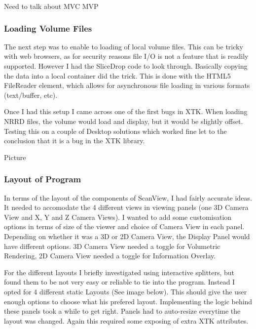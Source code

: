 \documentclass[a4paper,11pt,titlepage]{article}
\begin{document}
Need to talk about MVC MVP


\subsubsection{Loading Volume Files}

The next step was to enable to loading of local volume files. This can be tricky with web browsers, as for security reasons file I/O is not a feature that is readily supported. However I had the SliceDrop code to look through. Basically copying the data into a local container did the trick. This is done with the HTML5 FileReader element, which allows for asynchronous file loading in various formats (text/buffer, etc).

Once I had this setup I came across one of the first bugs in XTK. When loading NRRD files, the volume would load and display, but it would be slightly offset. Testing this on a couple of Desktop solutions which worked fine let to the conclusion that it is a bug in the XTK library. 

Picture



\subsubsection{Layout of Program}

In terms of the layout of the components of ScanView, I had fairly accurate ideas. It needed to accomodate the 4 different views in viewing panels (one 3D Camera View and X, Y and Z Camera Views). I wanted to add some customisation options in terms of size of the viewer and choice of Camera View in each panel. Depending on whether it was a 3D or 2D Camera View, the Display Panel would have different options. 3D Camera View needed a toggle for Volumetric Rendering, 2D Camera View needed a toggle for Information Overlay.







For the different layouts I briefly investigated using interactive splitters, but found them to be not very easy or reliable to tie into the program. Instead I opted for 4 different static Layouts (See image below). This should give the user enough options to choose what his prefered layout. Implementing the logic behind these panels took a while to get right. Panels had to auto-resize everytime the layout was changed. Again this required some exposing of extra XTK attributes.
\end{document}
